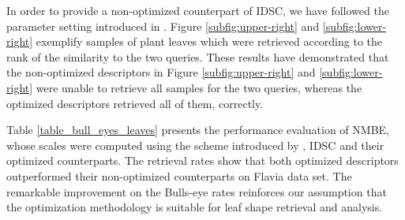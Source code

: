 In order to provide a non-optimized counterpart of IDSC, we have followed the parameter setting introduced in .
Figure \ref{subfig:upper-right} and \ref{subfig:lower-right} exemplify samples of  plant leaves which were retrieved according to the rank of the similarity to the two queries. These results have demonstrated that the non-optimized descriptors in Figure \ref{subfig:upper-right} and \ref{subfig:lower-right} were unable to retrieve all samples for the two queries, whereas the  optimized descriptors retrieved all of them, correctly.
\begin{comment}
\begin{figure}[t!]
\begin{subfigure}{0.55\textwidth}
\texttt{[image: fig10a.eps]}
\caption{Retrieval rates. \label{fig1Ooptimization_graph}}
\end{subfigure}
\hspace*{\fill}
\begin{minipage}{0.45\textwidth}
\begin{subfigure}{\textwidth}
\texttt{[image: fig10b.eps]}
\caption{Retrieval results with NMBE.} \label{subfig:upper-right}

\end{subfigure}

\vspace*{0.60cm}
\begin{subfigure}{\textwidth}
\texttt{[image: fig10c.eps]}
\caption{Retrieval results with IDSC.\label{subfig:lower-right}}
\end{subfigure}
\end{minipage}

\caption{\label{figfig1Optmization-IDSC} Experiments conducted on Flavia leaf data set (a) retrieval rate by using both NMBE and IDSC and their optimized counterparts, (b) and (c) two leaf shape retrieval examples by using the non-optimized and optimized NMBE and IDSC descriptors, respectively.} 
\end{figure}
\end{comment}

 Table \ref{table_bull_eyes_leaves} presents the performance evaluation of NMBE, whose scales were computed using the scheme introduced by , IDSC and their optimized counterparts.  The retrieval rates show that both optimized descriptors outperformed their non-optimized counterparts on Flavia data set. The remarkable improvement on the Bulls-eye rates reinforces our assumption that the optimization methodology is suitable for leaf shape retrieval and analysis.

